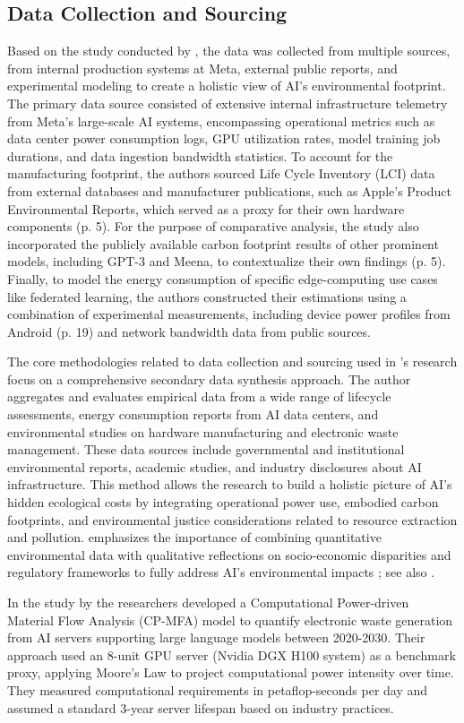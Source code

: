 \documentclass[a4paper, 12pt]{article}
\begin{document}
\subsection{Data Collection and Sourcing}
Based on the study conducted by \citet{Wu2022}, the data was collected from multiple sources, from internal production systems at Meta, external public reports, and experimental modeling to create a holistic view of AI's environmental footprint. The primary data source consisted of extensive internal infrastructure telemetry from Meta's large-scale AI systems, encompassing operational metrics such as data center power consumption logs, GPU utilization rates, model training job durations, and data ingestion bandwidth statistics. To account for the manufacturing footprint, the authors sourced Life Cycle Inventory (LCI) data from external databases and manufacturer publications, such as Apple's Product Environmental Reports, which served as a proxy for their own hardware components (p. 5). For the purpose of comparative analysis, the study also incorporated the publicly available carbon footprint results of other prominent models, including GPT-3 and Meena, to contextualize their own findings (p. 5). Finally, to model the energy consumption of specific edge-computing use cases like federated learning, the authors constructed their estimations using a combination of experimental measurements, including device power profiles from Android (p. 19) and network bandwidth data from public sources.

\hspace{24pt}The core methodologies related to data collection and sourcing used in \citet{Zhuk2023}'s research focus on a comprehensive secondary data synthesis approach. The author aggregates and evaluates empirical data from a wide range of lifecycle assessments, energy consumption reports from AI data centers, and environmental studies on hardware manufacturing and electronic waste management. These data sources include governmental and institutional environmental reports, academic studies, and industry disclosures about AI infrastructure. This method allows the research to build a holistic picture of AI’s hidden ecological costs by integrating operational power use, embodied carbon footprints, and environmental justice considerations related to resource extraction and pollution. \citet{Zhuk2023} emphasizes the importance of combining quantitative environmental data with qualitative reflections on socio-economic disparities and regulatory frameworks to fully address AI’s environmental impacts \citep[pp.~20--22]{Zhuk2023}; see also \citep{OECD2022, MIT2025}.
\par In the study by \cite{wang_2024_ewaste} the researchers developed a Computational Power-driven Material Flow Analysis (CP-MFA) model to quantify electronic waste generation from AI servers supporting large language models between 2020-2030. Their approach used an 8-unit GPU server (Nvidia DGX H100 system) as a benchmark proxy, applying Moore's Law to project computational power intensity over time. They measured computational requirements in petaflop-seconds per day and assumed a standard 3-year server lifespan based on industry practices.
\end{document}
